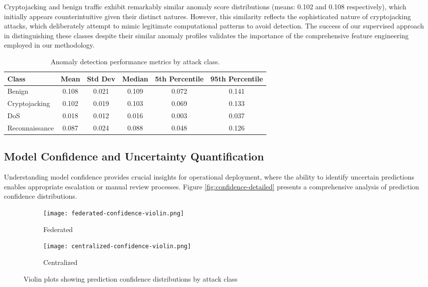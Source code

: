 Cryptojacking and benign traffic exhibit remarkably similar anomaly score distributions (means: 0.102 and 0.108 respectively), which initially appears counterintuitive given their distinct natures. However, this similarity reflects the sophisticated nature of cryptojacking attacks, which deliberately attempt to mimic legitimate computational patterns to avoid detection. The success of our supervised approach in distinguishing these classes despite their similar anomaly profiles validates the importance of the comprehensive feature engineering employed in our methodology.

\begin{table}[H]
	\centering
	\renewcommand{\arraystretch}{1.15}
	\setlength{\tabcolsep}{8pt}
	\caption{Anomaly detection performance metrics by attack class.}
	\label{table:anomaly-performance}
	\begin{tabular}{@{}lccccc@{}}
		\toprule
		\textbf{Class} & \textbf{Mean} & \textbf{Std Dev} & \textbf{Median} & \textbf{5th Percentile} & \textbf{95th Percentile} \\
		\midrule
		Benign & 0.108 & 0.021 & 0.109 & 0.072 & 0.141 \\
		Cryptojacking & 0.102 & 0.019 & 0.103 & 0.069 & 0.133 \\
		DoS & 0.018 & 0.012 & 0.016 & 0.003 & 0.037 \\
		Reconnaissance & 0.087 & 0.024 & 0.088 & 0.048 & 0.126 \\
		\bottomrule
	\end{tabular}
\end{table}

\subsection{Model Confidence and Uncertainty Quantification}

Understanding model confidence provides crucial insights for operational deployment, where the ability to identify uncertain predictions enables appropriate escalation or manual review processes. Figure \ref{fig:confidence-detailed} presents a comprehensive analysis of prediction confidence distributions.

\begin{figure}[H]
	\centering
		\renewcommand{\arraystretch}{1.15}
	\setlength{\tabcolsep}{8pt}
	\begin{subfigure}[b]{0.45\textwidth}
		\centering
		\texttt{[image: federated-confidence-violin.png]}
		\caption{Federated}
		\label{figure:federated-confidence}
	\end{subfigure}
	\hspace{0.25cm} 
	\begin{subfigure}[b]{0.45\textwidth}
		\centering
		\texttt{[image: centralized-confidence-violin.png]}
		\caption{Centralized}
		\label{figure:centralized-confidence}
	\end{subfigure}
	\caption{Violin plots showing prediction confidence distributions by attack class}
	\label{figure:confidence}
\end{figure}

